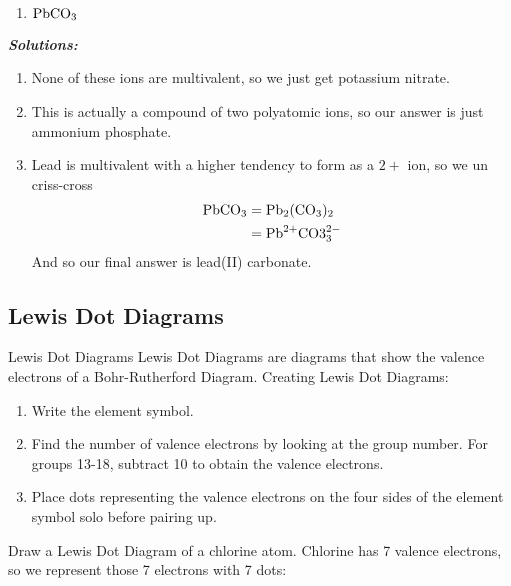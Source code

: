 \documentclass[12pt]{report}
\begin{document}
\begin{enumerate}
\begin{enumerate}[label=(\alph*)]
            \item{ $\ce{PbCO3}$}
        \end{enumerate}
        \textit{\textbf{Solutions:}}  
        \begin{enumerate}[label=(\alph*)]
            \item{None of these ions are multivalent, so we just get potassium nitrate.}
            \item{This is actually a compound of two polyatomic ions, so our answer is just ammonium phosphate.}
            \item{Lead is multivalent with a higher tendency to form as a $2+$ ion, so we un criss-cross 
                    \begin{align*}
                        \ce{PbCO3}&= \ce{Pb2(CO3)2}\\
                                  &= \text{Pb}^{2+} \text{CO3}^{2-}_{3}
                    \end{align*}
                And so our final answer is lead(II) carbonate.}
        \end{enumerate}
\end{enumerate}

\subsection{Lewis Dot Diagrams}
\begin{definition}{Lewis Dot Diagrams}
    Lewis Dot Diagrams are diagrams that show the valence electrons of a Bohr-Rutherford Diagram. Creating Lewis Dot Diagrams: 
    \begin{enumerate}
    \setlength\itemsep{0.5em}
        \item{Write the element symbol.}
        \item{Find the number of valence electrons by looking at the group number. For groups 13-18, subtract 10 to obtain the valence electrons.}
        \item{Place dots representing the valence electrons on the four sides of the element symbol solo before pairing up.}
    \end{enumerate}
\end{definition}

\begin{example}{Draw a Lewis Dot Diagram of a chlorine atom.}
    Chlorine has 7 valence electrons, so we represent those 7 electrons with 7 dots:
    \begin{center}
    \end{center}
\end{example}
\end{document}
